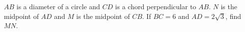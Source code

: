 $AB$ is a diameter of a circle and $CD$ is a chord perpendicular to $AB$. $N$ is the midpoint of $AD$ and $M$ is the midpoint of $CB$. If $BC=6$ and $AD=2\sqrt3$, find $MN$.
